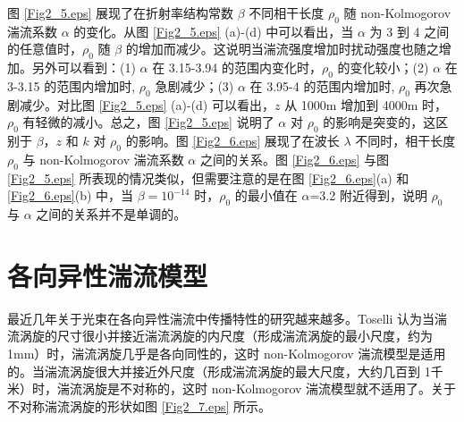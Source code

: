 \documentclass[master]{thesis-uestc}
\begin{document}
图 \ref{Fig2_5.eps} 展现了在折射率结构常数 $\beta$ 不同相干长度 $\rho_0$ 随 non-Kolmogorov 湍流系数 $\alpha$ 的变化。从图 \ref{Fig2_5.eps} (a)-(d) 中可以看出，当 $\alpha$ 为  3 到  4 之间的任意值时，$\rho_0$ 随 $\beta$ 的增加而减少。这说明当湍流强度增加时扰动强度也随之增加。另外可以看到：(1) $\alpha$ 在 3.15-3.94 的范围内变化时，$\rho_0$ 的变化较小；(2) $\alpha$ 在 3-3.15 的范围内增加时, $\rho_0$ 急剧减少；(3) $\alpha$ 在 3.95-4 的范围内增加时, $\rho_0$ 再次急剧减少。对比图 \ref{Fig2_5.eps} (a)-(d) 可以看出，$z$ 从 1000m 增加到 4000m 时，$\rho_0$ 有轻微的减小。总之，图 \ref{Fig2_5.eps} 说明了 $\alpha$ 对 $\rho_0$ 的影响是突变的，这区别于 $\beta$，$z$ 和 $k$ 对 $\rho_0$ 的影响。图 \ref{Fig2_6.eps} 展现了在波长 $\lambda$ 不同时，相干长度 $\rho_0$ 与 non-Kolmogorov 湍流系数 $\alpha$ 之间的关系。图 \ref{Fig2_6.eps} 与图 \ref{Fig2_5.eps} 所表现的情况类似，但需要注意的是在图 \ref{Fig2_6.eps}(a) 和 \ref{Fig2_6.eps}(b) 中，当 $\beta=10^{-14}$ 时，$\rho_0$ 的最小值在 $\alpha$=3.2 附近得到，说明 $\rho_0$ 与 $\alpha$ 之间的关系并不是单调的。

\section{各向异性湍流模型}
最近几年关于光束在各向异性湍流中传播特性的研究越来越多。Toselli 认为当湍流涡旋的尺寸很小并接近湍流涡旋的内尺度（形成湍流涡旋的最小尺度，约为 1mm）时，湍流涡旋几乎是各向同性的，这时 non-Kolmogorov 湍流模型是适用的。当湍流涡旋很大并接近外尺度（形成湍流涡旋的最大尺度，大约几百到 1千米）时，湍流涡旋是不对称的，这时 non-Kolmogorov 湍流模型就不适用了。关于不对称湍流涡旋的形状如图 \ref{Fig2_7.eps} 所示。

\end{document}
